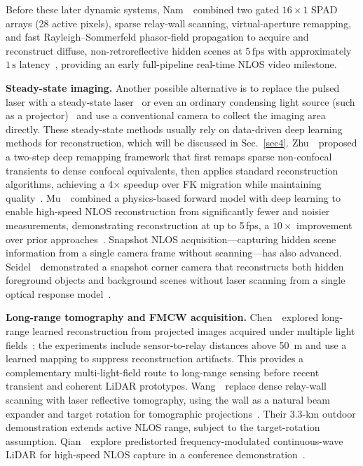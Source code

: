 Before these later dynamic systems, Nam~\etal~combined two gated $16\times1$ SPAD arrays (28 active pixels), sparse relay-wall scanning, virtual-aperture remapping, and fast Rayleigh--Sommerfeld phasor-field propagation to acquire and reconstruct diffuse, non-retroreflective hidden scenes at $5\,\mathrm{fps}$ with approximately $1\,\mathrm{s}$ latency~\cite{nam_real-time_2020}, providing an early full-pipeline real-time NLOS video milestone.

\vspace{0.8mm}
\noindent \textbf{Steady-state imaging.}
Another possible alternative is to replace the pulsed laser with a steady-state laser~\cite{chenSteadystateNonLineofSightImaging2019} or even an ordinary condensing light source (such as a projector)~\cite{chandranAdaptiveLightingDataDriven2019} and use a conventional camera to collect the imaging area directly. These steady-state methods usually rely on data-driven deep learning methods for reconstruction, which will be discussed in Sec.~\ref{sec4}. Zhu~\etal~proposed a two-step deep remapping framework that first remaps sparse non-confocal transients to dense confocal equivalents, then applies standard reconstruction algorithms, achieving a 4$\times$ speedup over FK migration while maintaining quality~\cite{zhuTwoStepRemapping2022}. Mu~\etal~combined a physics-based forward model with deep learning to enable high-speed NLOS reconstruction from significantly fewer and noisier measurements, demonstrating reconstruction at up to 5\,fps, a $10\times$ improvement over prior approaches~\cite{muphysicsrescue2022}. Snapshot NLOS acquisition---capturing hidden scene information from a single camera frame without scanning---has also advanced. Seidel~\etal~demonstrated a snapshot corner camera that reconstructs both hidden foreground objects and background scenes without laser scanning from a single optical response model~\cite{seidelSnapshot2023}.

\vspace{0.8mm}
\noindent \textbf{Long-range tomography and FMCW acquisition.}
Chen~\etal~explored long-range learned reconstruction from projected images acquired under multiple light fields~\cite{chenLongRangeMultiLightField2023}; the experiments include sensor-to-relay distances above 50~m and use a learned mapping to suppress reconstruction artifacts. This provides a complementary multi-light-field route to long-range sensing before recent transient and coherent LiDAR prototypes.
Wang~\etal~replace dense relay-wall scanning with laser reflective tomography, using the wall as a natural beam expander and target rotation for tomographic projections~\cite{wangLRTNLOS2026}. Their 3.3-km outdoor demonstration extends active NLOS range, subject to the target-rotation assumption. Qian~\etal~explore predistorted frequency-modulated continuous-wave LiDAR for high-speed NLOS capture in a conference demonstration~\cite{qianHighSpeedNLOSFMCW2026}.

